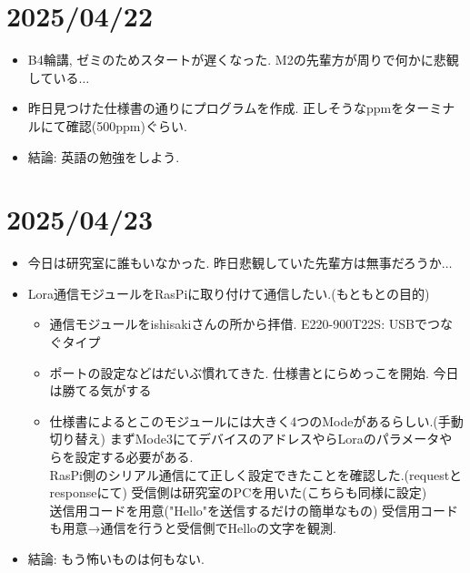 \documentclass[11pt,a4paper,uplatex]{jsarticle}
\begin{document}
\section{2025/04/22}
\begin{itemize}
    \item B4輪講, ゼミのためスタートが遅くなった. M2の先輩方が周りで何かに悲観している$\dots$
    \item 昨日見つけた仕様書の通りにプログラムを作成. 正しそうなppmをターミナルにて確認(500ppm)ぐらい.
    \item 結論: 英語の勉強をしよう.
\end{itemize}


\section{2025/04/23}
\begin{itemize}
    \item 今日は研究室に誰もいなかった. 昨日悲観していた先輩方は無事だろうか$\dots$
    \item Lora通信モジュールをRasPiに取り付けて通信したい.(もともとの目的)
    \begin{itemize}
        \item 通信モジュールをishisakiさんの所から拝借. E220-900T22S: USBでつなぐタイプ
        \item ポートの設定などはだいぶ慣れてきた. 仕様書とにらめっこを開始. 今日は勝てる気がする
        \item 仕様書によるとこのモジュールには大きく4つのModeがあるらしい.(手動切り替え) まずMode3にてデバイスのアドレスやらLoraのパラメータやらを設定する必要がある. \\ 
        RasPi側のシリアル通信にて正しく設定できたことを確認した.(requestとresponseにて) 受信側は研究室のPCを用いた(こちらも同様に設定) \\
        送信用コードを用意("Hello"を送信するだけの簡単なもの) 受信用コードも用意→通信を行うと受信側でHelloの文字を観測.
    \end{itemize}
    \item 結論: もう怖いものは何もない.
\end{itemize}
\end{document}
